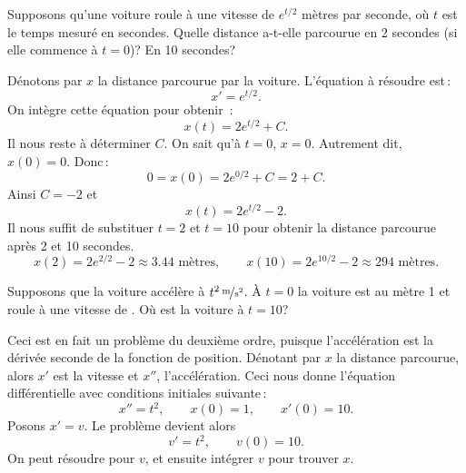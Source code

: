 \begin{example}
Supposons qu'une voiture roule à une vitesse de $e^{t/2}$ mètres par seconde, où $t$ est le temps mesuré en secondes.
Quelle distance a-t-elle parcourue en 2 secondes (si elle commence à $t=0$)?  En 10 secondes?

Dénotons par $x$ la distance parcourue par la voiture.
L'équation à résoudre est\,: 
\begin{equation*}
x' = e^{t/2} .
\end{equation*}
On intègre cette équation pour obtenir \,:
\begin{equation*}
x(t) = 2 e^{t/2} + C . 
\end{equation*}
Il nous reste à déterminer $C$.  On sait qu'à $t=0$,
$x=0$.  Autrement dit, $x(0) = 0$.  Donc\,: 
\begin{equation*}
0 = x(0) = 2e^{0/2} + C = 2 + C .
\end{equation*}
Ainsi $C = -2$ et
\begin{equation*}
x(t) = 2 e^{t/2} - 2 .
\end{equation*}
Il nous suffit de substituer $t=2$ et $t=10$ pour obtenir la distance parcourue après 2 et 10 secondes.
\begin{equation*}
x(2) = 2e^{2/2} - 2 \approx 3.44 \text{ mètres} ,
\qquad
x(10) = 2e^{10/2} - 2 \approx 294 \text{ mètres} .
\end{equation*}
\end{example}

\begin{example}
Supposons que la voiture accélère à $\unitfrac[t^2]{m}{s^2}$.
À $t=0$ la voiture est au mètre 1 et roule à une vitesse de 
.  Où est la voiture à $t=10$?

Ceci est en fait un problème du deuxième ordre, puisque l'accélération est la dérivée seconde de la fonction de position.  Dénotant par $x$ la distance parcourue, alors $x'$ est la vitesse et $x''$, l'accélération.
Ceci nous donne l'équation différentielle avec conditions initiales suivante\,:
\begin{equation*}
x'' = t^2 , \qquad x(0) = 1 , \qquad x'(0) = 10 .
\end{equation*}
Posons $x' = v$.  Le problème devient alors
\begin{equation*}
v' = t^2, \qquad v(0) = 10 .
\end{equation*}
On peut résoudre pour $v$, et ensuite intégrer $v$ pour trouver $x$.
\end{example}

